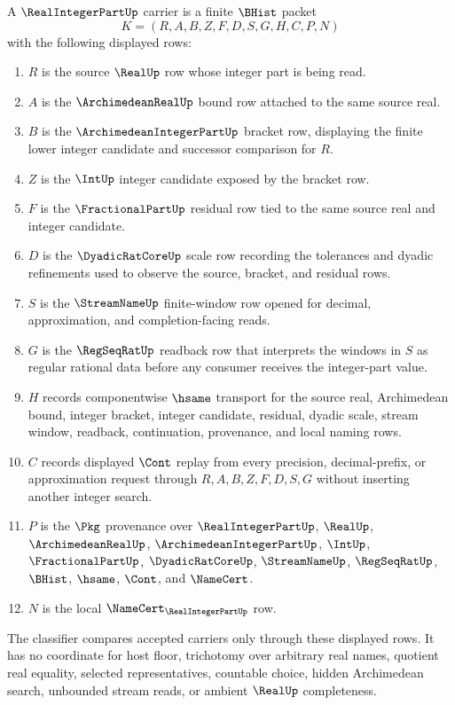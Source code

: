 \begin{definition}
\label{def:real-integer-part-carrier}
A $\RealIntegerPartUp$ carrier is a finite $\BHist$ packet
$$
K=(R,A,B,Z,F,D,S,G,H,C,P,N)
$$
with the following displayed rows:
\begin{enumerate}
\item $R$ is the source $\RealUp$ row whose integer part is being read.
\item $A$ is the $\ArchimedeanRealUp$ bound row attached to the same source real.
\item $B$ is the $\ArchimedeanIntegerPartUp$ bracket row, displaying the finite lower integer candidate and successor comparison for $R$.
\item $Z$ is the $\IntUp$ integer candidate exposed by the bracket row.
\item $F$ is the $\FractionalPartUp$ residual row tied to the same source real and integer candidate.
\item $D$ is the $\DyadicRatCoreUp$ scale row recording the tolerances and dyadic refinements used to observe the source, bracket, and residual rows.
\item $S$ is the $\StreamNameUp$ finite-window row opened for decimal, approximation, and completion-facing reads.
\item $G$ is the $\RegSeqRatUp$ readback row that interprets the windows in $S$ as regular rational data before any consumer receives the integer-part value.
\item $H$ records componentwise $\hsame$ transport for the source real, Archimedean bound, integer bracket, integer candidate, residual, dyadic scale, stream window, readback, continuation, provenance, and local naming rows.
\item $C$ records displayed $\Cont$ replay from every precision, decimal-prefix, or approximation request through $R,A,B,Z,F,D,S,G$ without inserting another integer search.
\item $P$ is the $\Pkg$ provenance over $\RealIntegerPartUp$, $\RealUp$, $\ArchimedeanRealUp$, $\ArchimedeanIntegerPartUp$, $\IntUp$, $\FractionalPartUp$, $\DyadicRatCoreUp$, $\StreamNameUp$, $\RegSeqRatUp$, $\BHist$, $\hsame$, $\Cont$, and $\NameCert$.
\item $N$ is the local $\NameCert_{\RealIntegerPartUp}$ row.
\end{enumerate}
The classifier compares accepted carriers only through these displayed rows. It has no coordinate for host floor, trichotomy over arbitrary real names, quotient real equality, selected representatives, countable choice, hidden Archimedean search, unbounded stream reads, or ambient $\RealUp$ completeness.
\end{definition}

